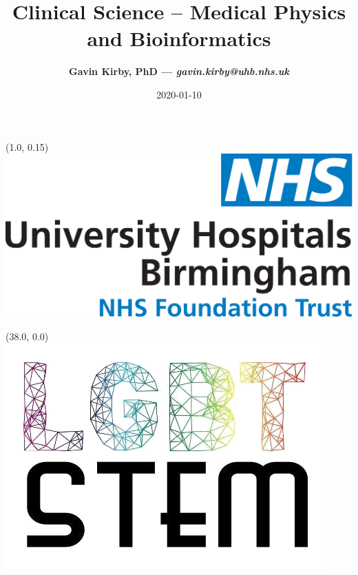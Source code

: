 \documentclass[final, unknownkeysallowed]{beamer}
\title{Clinical Science -- Medical Physics and Bioinformatics}
\author{\textbf{Gavin Kirby, PhD --- \textit{gavin.kirby@uhb.nhs.uk}}}
\institute[UHB]{University Hospitals Birmingham NHS Foundation Trust}
\date{2020-01-10}
\begin{document}
\begin{textblock}{6}(1.0, 0.15)
    \includegraphics[height = 23 mm]{uhb-logo.png}
\end{textblock}
\begin{textblock}{6}(38.0, 0.0)
    \includegraphics[height = 23 mm]{lgbtstem_test_transparent.png}
\end{textblock}
\end{document}
